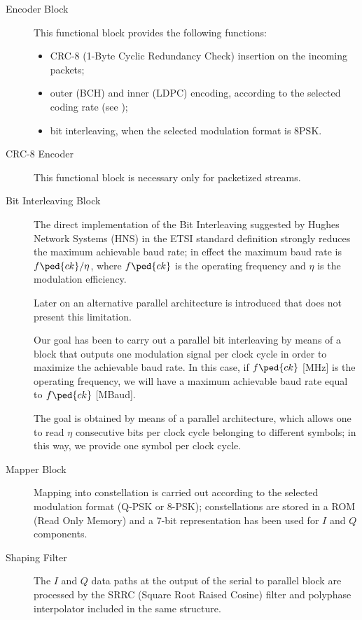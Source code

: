 \begin{description}
\item[Encoder Block] This functional block provides the following functions:
    \begin{itemize}
    \item 	CRC-8 (1-Byte Cyclic Redundancy Check) insertion on the incoming packets;
    \item outer (BCH) and inner (LDPC) encoding, according to the selected coding rate (see );
    \item bit interleaving, when the selected modulation format is 8PSK.
    \end{itemize}

\item[CRC-8 Encoder] This functional block is necessary only for packetized streams.

\item[Bit Interleaving Block] The direct implementation of the Bit Interleaving suggested by Hughes Network Systems (HNS) in the ETSI standard definition strongly reduces the maximum achievable baud rate; in effect the maximum baud rate is \(f\ped{ck}/\eta\), where \(f\ped{ck}\) is the operating frequency and \(\eta\) is the modulation efficiency.

    Later on an alternative parallel architecture is introduced that does not present this limitation.

    Our goal has been to carry out a parallel bit interleaving by means of a block that outputs one modulation signal per clock cycle in order to maximize the achievable baud rate. In this case, if \(f\ped{ck}\) [MHz] is the operating frequency, we will have a maximum achievable baud rate equal to \(f\ped{ck}\) [MBaud].

    The goal is obtained by means of a parallel architecture, which allows one to read \(\eta\) consecutive bits per clock cycle belonging to different symbols; in this way, we provide one symbol per clock cycle.

\item[Mapper Block] Mapping into constellation is carried out according to the selected modulation format (Q-PSK or 8-PSK); constellations are stored in a ROM (Read Only Memory) and a 7-bit representation has been used for \(I\) and \(Q\) components.

\item[Shaping Filter] The \(I\) and \(Q\) data paths at the output of the serial to parallel block are processed by the SRRC (Square Root Raised Cosine) filter and polyphase interpolator included in the same structure.


\end{description}
